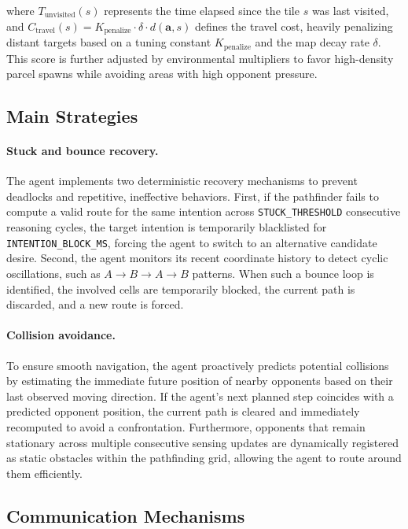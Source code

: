 where $T_{\text{unvisited}}(s)$ represents the time elapsed since the tile $s$ was last visited, and $C_{\text{travel}}(s) = K_{\text{penalize}} \cdot \delta \cdot d(\mathbf{a},s)$ defines the travel cost, heavily penalizing distant targets based on a tuning constant $K_{\text{penalize}}$ and the map decay rate $\delta$. This score is further adjusted by environmental multipliers to favor high-density parcel spawns while avoiding areas with high opponent pressure.

\subsection{Main Strategies}

\paragraph{Stuck and bounce recovery.}
The agent implements two deterministic recovery mechanisms to prevent deadlocks and repetitive, ineffective behaviors. First, if the pathfinder fails to compute a valid route for the same intention across \texttt{STUCK\_THRESHOLD} consecutive reasoning cycles, the target intention is temporarily blacklisted for \texttt{INTENTION\_BLOCK\_MS}, forcing the agent to switch to an alternative candidate desire. Second, the agent monitors its recent coordinate history to detect cyclic oscillations, such as $A \to B \to A \to B$ patterns. When such a bounce loop is identified, the involved cells are temporarily blocked, the current path is discarded, and a new route is forced.

\paragraph{Collision avoidance.}
To ensure smooth navigation, the agent proactively predicts potential collisions by estimating the immediate future position of nearby opponents based on their last observed moving direction. If the agent's next planned step coincides with a predicted opponent position, the current path is cleared and immediately recomputed to avoid a confrontation. Furthermore, opponents that remain stationary across multiple consecutive sensing updates are dynamically registered as static obstacles within the pathfinding grid, allowing the agent to route around them efficiently.

\subsection{Communication Mechanisms}

